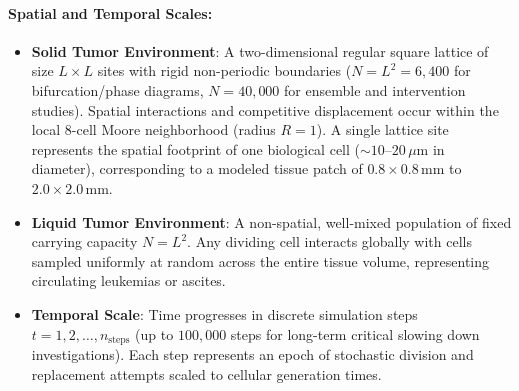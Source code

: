 \documentclass[11pt,a4paper]{article}
\begin{document}
\paragraph{Spatial and Temporal Scales:}
\begin{itemize}
    \item \textbf{Solid Tumor Environment}: A two-dimensional regular square lattice of size $L \times L$ sites with rigid non-periodic boundaries ($N = L^2 = 6,400$ for bifurcation/phase diagrams, $N = 40,000$ for ensemble and intervention studies). Spatial interactions and competitive displacement occur within the local 8-cell Moore neighborhood (radius $R = 1$). A single lattice site represents the spatial footprint of one biological cell ($\sim 10\text{--}20\,\mu\text{m}$ in diameter), corresponding to a modeled tissue patch of $0.8 \times 0.8\,\text{mm}$ to $2.0 \times 2.0\,\text{mm}$.
    \item \textbf{Liquid Tumor Environment}: A non-spatial, well-mixed population of fixed carrying capacity $N = L^2$. Any dividing cell interacts globally with cells sampled uniformly at random across the entire tissue volume, representing circulating leukemias or ascites.
    \item \textbf{Temporal Scale}: Time progresses in discrete simulation steps $t = 1, 2, \dots, n_{\text{steps}}$ (up to $100,000$ steps for long-term critical slowing down investigations). Each step represents an epoch of stochastic division and replacement attempts scaled to cellular generation times.
\end{itemize}
\end{document}
